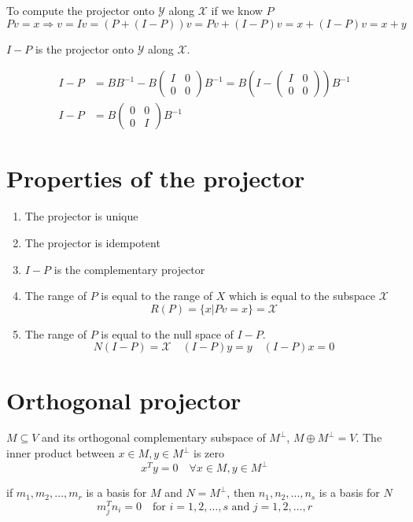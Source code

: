 To compute the projector onto $\mathcal{Y}$ along $\mathcal{X}$ if we know $P$
\[
Pv = x \Rightarrow v = Iv = (P + (I - P))v = Pv + (I - P)v = x + (I - P)v = x + y
\]

$I - P$ is the projector onto $\mathcal{Y}$ along $\mathcal{X}$.

\[
\begin{aligned}
    I - P &= BB^{-1} - B\begin{pmatrix}
        I & 0 \\
        0 & 0
    \end{pmatrix}B^{-1} = B(I - \begin{pmatrix}
        I & 0 \\
        0 & 0
    \end{pmatrix})B^{-1} \\
    I - P &= B\begin{pmatrix}
        0 & 0 \\
        0 & I
    \end{pmatrix}B^{-1}
\end{aligned}
\]
\section{Properties of the projector}
\begin{enumerate}
    \item The projector is unique
    \item The projector is idempotent
    \item $I - P$ is the complementary projector
    \item The range of $P$ is equal to the range of $X$ which is equal to the subspace $\mathcal{X}$
        \[ R(P) = \{ x | Pv = x \} = \mathcal{X} \]
    \item The range of $P$ is equal to the null space of $I - P$.
\[N(I - P) = \mathcal{X} \quad (I - P)y = y \quad (I - P)x = 0 \]
\end{enumerate}

\section{Orthogonal projector}
$M \subseteq V$ and its orthogonal complementary subspace of $M^{\perp}$, $M \oplus M^{\perp} = V$.
The inner product between $x \in M, y \in M^{\perp}$ is zero
$$x^Ty = 0 \quad \forall x \in M, y \in M^{\perp}$$

if $m_1, m_2, \ldots, m_r$ is a basis for $M$ and $N=M^{\perp}$, then $n_1, n_2, \ldots, n_s$ is a basis for $N$
$$ m_j^Tn_i = 0 \quad \text{for } i=1,2,\ldots,s \text{ and } j=1,2,\ldots,r $$


